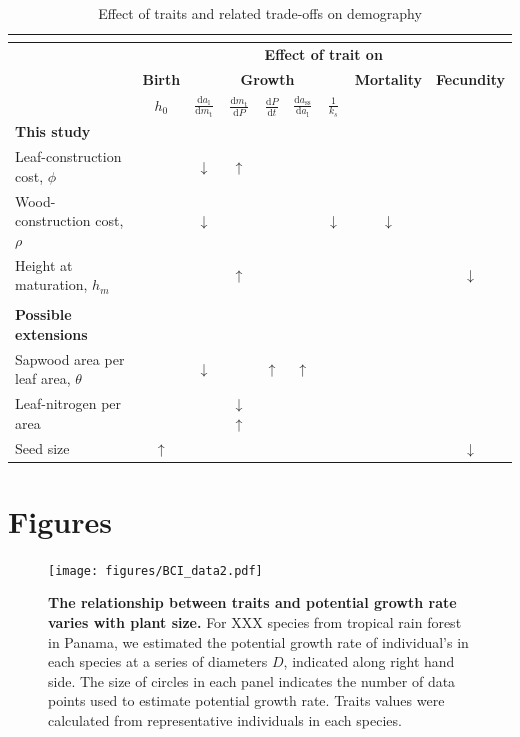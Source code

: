 \documentclass[12pt, a4paper]{article}
\begin{document}
\begin{table}[h]
\caption{Effect of traits and related trade-offs on demography}
\centering
{\footnotesize  %
  \begin{doublespace}
  \begin{tabular}[c]{l|c|ccccc|c|c}
  \multicolumn{9}{c}{}\\ \hline
  & \multicolumn{8}{c}{\textbf{Effect of trait on}}\\
  & \textbf{Birth} & \multicolumn{5}{c|}{\textbf{Growth}} & \textbf{Mortality} & \textbf{Fecundity} \\
  & $h_0$
  & $\frac{\textrm{d}a_\textrm{l}}{\textrm{d}m_\textrm{t}}$
  & $\frac{\textrm{d}m_\textrm{t}}{\textrm{d}P}$
  & $\frac{\textrm{d}P}{\textrm{d}t}$
  & $\frac{\textrm{d}a_\textrm{ss}}{\textrm{d}a_\textrm{l}}$
  & $\frac{1}{k_s}$ & &  \\\hline
  \textbf{This study}&&&&&&&&\\
  Leaf-construction cost, $\phi$ & & $\downarrow$ & $\uparrow$ & & & & \\
  Wood-construction cost, $\rho$ & & $\downarrow$ &  & & & $\downarrow$ & $\downarrow$  \\
  Height at maturation, $h_m$ & & &$\uparrow$ & & & & & $\downarrow$  \\
  &&&&&&&&\\\hline
  \textbf{Possible extensions}&&&&&&&&\\
  Sapwood area per leaf area, $\theta$ & & $\downarrow$& & $\uparrow$ & $\uparrow$ & & \\
  Leaf-nitrogen per area & & &$\downarrow$$\uparrow$ & & & & & \\
  Seed size & $\uparrow$ & & & & & & & $\downarrow$ \\ \hline
  \end{tabular}
  \end{doublespace}
}
\label{tab:trade-offs}
\end{table}


\newpage

\section{Figures}\label{figures}

\begin{figure}[htbp]
\centering
\texttt{[image: figures/BCI\_data2.pdf]}
\caption{\textbf{The relationship between traits and potential growth
rate varies with plant size.} For XXX species from tropical rain forest
in Panama, we estimated the potential growth rate of individual's in
each species at a series of diameters $D$, indicated along right hand
side. The size of circles in each panel indicates the number of data
points used to estimate potential growth rate. Traits values were
calculated from representative individuals in each species.
\label{f-BCI}}
\end{figure}
\end{document}
